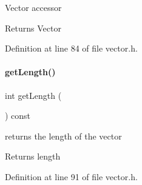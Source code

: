 Vector accessor \begin{DoxyReturn}{Returns}
Vector 
\end{DoxyReturn}


Definition at line 84 of file vector.\+h.

\mbox{\label{classamici_1_1_ami_vector_a5f00d4dc3e7866d193ce926f35542801}} 
\paragraph{\texorpdfstring{getLength()}{getLength()}}
{\footnotesize\ttfamily int get\+Length (\begin{DoxyParamCaption}{ }\end{DoxyParamCaption}) const}

returns the length of the vector \begin{DoxyReturn}{Returns}
length 
\end{DoxyReturn}


Definition at line 91 of file vector.\+h.

